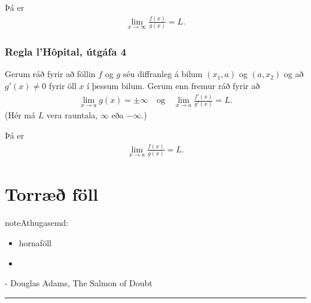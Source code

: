 \documentclass[a4paper,10pt,icelandic]{sphinxmanual}
\begin{document}
Þá er
\begin{equation*}
\begin{split}\lim_{x\rightarrow \infty}\frac{f(x)}{g(x)}=L.\end{split}
\end{equation*}

\subsection{Regla l’Hôpital, útgáfa 4}
\label{\detokenize{kafli03:regla-lhopital-utgafa-4}}
Gerum ráð fyrir að föllin \(f\) og \(g\) séu diffranleg á bilum
\((x_1, a)\) og \((a, x_2)\) og að \(g'(x)\neq 0\) fyrir öll
\(x\) í þessum bilum. Gerum enn fremur ráð fyrir að
\begin{equation*}
\begin{split}\lim_{x\rightarrow a}g(x)=\pm\infty
\quad\mbox{og}\quad \lim_{x\rightarrow a}\frac{f'(x)}{g'(x)}=L.\end{split}
\end{equation*}
(Hér má \(L\) vera rauntala, \(\infty\) eða \(-\infty\).)

Þá er
\begin{equation*}
\begin{split}\lim_{x\rightarrow a}\frac{f(x)}{g(x)}=L.\end{split}
\end{equation*}

\chapter{Torræð föll}
\label{\detokenize{kafli04:torrae-foll}}\label{\detokenize{kafli04::doc}}
\begin{sphinxadmonition}{note}{Athugasemd:}
\begin{itemize}
\item {} 
hornaföll

\item {} 
{\hyperref[\detokenize{kafli01:andhverfa}]{}}

\end{itemize}
\end{sphinxadmonition}


- Douglas Adams, The Salmon of Doubt


\bigskip\hrule\bigskip
\end{document}
